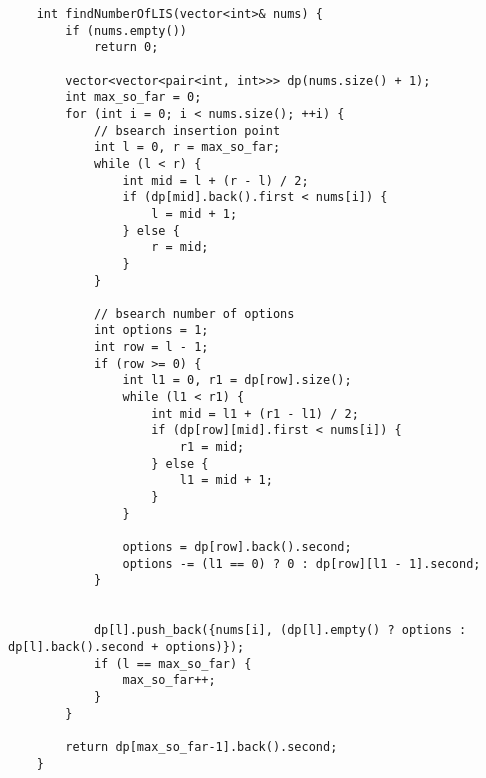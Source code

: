 \documentclass[12pt]{article}
\begin{document}
\begin{lstlisting}
    int findNumberOfLIS(vector<int>& nums) {
        if (nums.empty())
            return 0;
        
        vector<vector<pair<int, int>>> dp(nums.size() + 1);
        int max_so_far = 0;
        for (int i = 0; i < nums.size(); ++i) {
            // bsearch insertion point
            int l = 0, r = max_so_far;
            while (l < r) {
                int mid = l + (r - l) / 2;
                if (dp[mid].back().first < nums[i]) {
                    l = mid + 1;
                } else {
                    r = mid;
                }
            }
            
            // bsearch number of options
            int options = 1;
            int row = l - 1;
            if (row >= 0) {
                int l1 = 0, r1 = dp[row].size();
                while (l1 < r1) {
                    int mid = l1 + (r1 - l1) / 2;
                    if (dp[row][mid].first < nums[i]) {
                        r1 = mid;
                    } else {
                        l1 = mid + 1;
                    }
                }
                
                options = dp[row].back().second;
                options -= (l1 == 0) ? 0 : dp[row][l1 - 1].second;
            }
            
            
            dp[l].push_back({nums[i], (dp[l].empty() ? options : dp[l].back().second + options)});
            if (l == max_so_far) {
                max_so_far++;
            }
        }
        
        return dp[max_so_far-1].back().second;
    }
\end{lstlisting}

\egroup
\end{document}

